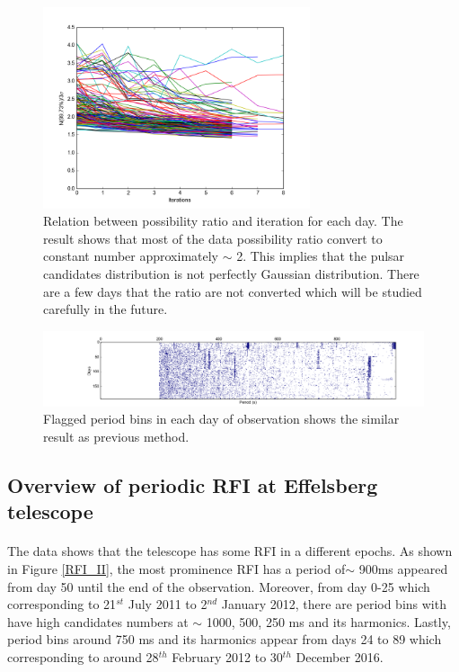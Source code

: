 \documentclass[thesis_msc.tex]{subfiles}
\begin{document}
\begin{figure}[h!] 
\centering
\includegraphics[width=0.7\textwidth]{figures/3sig.png}
\caption{Relation between possibility ratio and iteration for each day. The result shows that most of the data possibility ratio convert to constant number approximately $\sim$ 2. This implies that the pulsar candidates distribution is not perfectly Gaussian distribution. There are a few days that the ratio are not converted which will be studied carefully in the future.}
\label{RFI_3sig}
\end{figure}

\begin{figure}[h!] 
\centering
\includegraphics[width=1.0\textwidth]{figures/method2.png}
\caption{Flagged period bins in each day of observation shows the similar result as previous method.}
\label{RFI_III}
\end{figure}
 \newpage
 \subsection{Overview of periodic RFI at Effelsberg telescope }
 \paragraph{} The data shows that the telescope has some RFI in a different epochs. As shown in Figure \ref{RFI_II}, the most prominence RFI has a period of$\sim$ 900ms appeared from day 50 until the end of the observation. Moreover, from day 0-25 which corresponding to 21$^{st}$  July 2011 to 2$^{nd}$  January 2012, there are period bins with have high candidates numbers at $\sim$ 1000, 500, 250 ms and its harmonics. Lastly, period bins around 750 ms and its harmonics appear from days 24 to 89 which corresponding to around 28$^{th}$ February 2012 to 30$^{th}$  December 2016.  
 \fi
\end{document}
